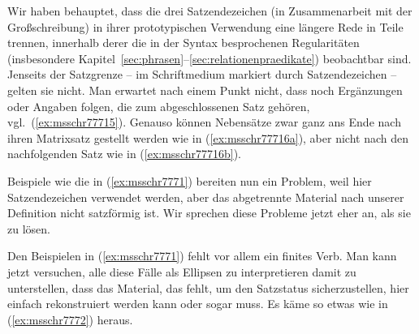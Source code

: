 
Wir haben behauptet, dass die drei Satzendezeichen (in Zusammenarbeit mit der Großschreibung) in ihrer prototypischen Verwendung eine längere Rede in Teile trennen, innerhalb derer die in der Syntax besprochenen Regularitäten (insbesondere Kapitel~\ref{sec:phrasen}--\ref{sec:relationenpraedikate}) beobachtbar sind.
Jenseits der Satzgrenze -- im Schriftmedium markiert durch Satzendezeichen -- gelten sie nicht.
Man erwartet \zB nach einem Punkt nicht, dass noch Ergänzungen oder Angaben folgen, die zum abgeschlossenen Satz gehören, vgl.\ (\ref{ex:msschr77715}).
Genauso können Nebensätze zwar ganz ans Ende nach ihren Matrixsatz gestellt werden wie in (\ref{ex:msschr77716a}), aber nicht nach den nachfolgenden Satz wie in (\ref{ex:msschr77716b}).

\begin{exe}
  \ex\label{ex:msschr77716}
  \begin{xlist}
  \end{xlist}
\end{exe}

Beispiele wie die in (\ref{ex:msschr7771}) bereiten nun ein Problem, weil hier Satzendezeichen verwendet werden, aber das abgetrennte Material nach unserer Definition nicht satzförmig ist.
Wir sprechen diese Probleme jetzt eher an, als sie zu lösen.

\begin{exe}
  \ex\label{ex:msschr7771}
  \begin{xlist}
  \end{xlist}
\end{exe}

Den Beispielen in (\ref{ex:msschr7771}) fehlt vor allem ein finites Verb.
Man kann jetzt versuchen, alle diese Fälle als Ellipsen zu interpretieren damit zu unterstellen, dass das Material, das fehlt, um den Satzstatus sicherzustellen, hier einfach rekonstruiert werden kann oder sogar muss.
Es käme so etwas wie in (\ref{ex:msschr7772}) heraus.

